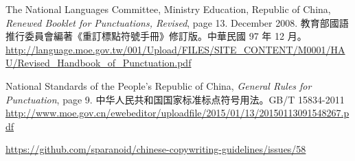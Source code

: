 \documentclass[a4paper, 12pt]{article}
\begin{document}
\begin{thebibliography}{9}

The National Languages Committee, Ministry Education, Republic of China, \textit{Renewed Booklet for Punctuations, Revised}, page 13. December 2008. 教育部國語推行委員會編著《重訂標點符號手冊》修訂版。中華民國 97 年 12 月。\,\url{http://language.moe.gov.tw/001/Upload/FILES/SITE_CONTENT/M0001/HAU/Revised_Handbook_of_Punctuation.pdf}

National Standards of the People's Republic of China, \textit{General Rules for Punctuation}, page 9. 中华人民共和国国家标准标点符号用法。GB/T 15834-2011 \,\url{http://www.moe.gov.cn/ewebeditor/uploadfile/2015/01/13/20150113091548267.pdf}

\url{https://github.com/sparanoid/chinese-copywriting-guidelines/issues/58}

\end{thebibliography}
\end{document}
